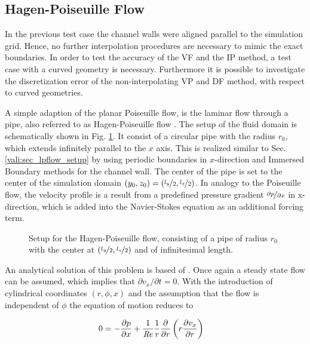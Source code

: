 \subsection{Hagen-Poiseuille Flow}

In the previous test case the channel walls were aligned parallel to the simulation grid. Hence, no further interpolation procedures
are necessary to mimic the exact boundaries.
In order to test the accuracy of the VF and the IP method, a test case with a curved geometry is necessary.
Furthermore it is possible to investigate the discretization error of the non-interpolating VP and DF method, with respect to curved geometries.

A simple adaption of the planar Poiseuille flow, is the laminar flow through a pipe, also referred to as Hagen-Poiseuille flow \citep{tritton88}.
The setup of the fluid domain is schematically shown in Fig. \ref{validation:setup_hpflow}.
It consist of a circular pipe with the radius $r_0$, which extends infinitely parallel to the $x$ axis.
This is realized similar to Sec. \ref{vali:sec_lpflow_setup} by using periodic boundaries in $x$-direction
and Immersed Boundary methods for the channel wall.
The center of the pipe is set to the center of the simulation domain ${(y_0, z_0) = (\nicefrac{l_y}{2}, \nicefrac{l_z}{2})}$.
In analogy to the Poiseuille flow, the velocity profile is a result from a predefined pressure gradient $\nicefrac{\partial p}{\partial x}$ in x-direction,
which  is added into the Navier-Stokes equation as an additional forcing term.

\begin{figure}[!bp]
      \centering
      \caption{Setup for the Hagen-Poiseuille flow, consisting of a pipe of radius $r_0$ with the center at  ${(\nicefrac{l_y}{2}, \nicefrac{l_z}{2})}$ and of infinitesimal length.}
    \label{validation:setup_hpflow}
\end{figure}

An analytical solution of this problem is based of \citep{Kundu2012}.
Once again a steady state flow can be assumed, which implies that $\partial v_x/\partial t = 0$. With the introduction of cylindrical coordinates $(r, \phi, x)$
and the assumption that the flow is independent of $\phi$ the equation of motion reduces to

\begin{align}
    \label{vali:hpflow:navstok}
        0 &= - \frac{\partial p}{\partial x}  +  \frac{1}{\mbox{\textit{Re}}} \frac{1}{r}\frac{\partial}{\partial r}\left(r\frac{\partial v_x}{\partial r}\right)
\end{align}

